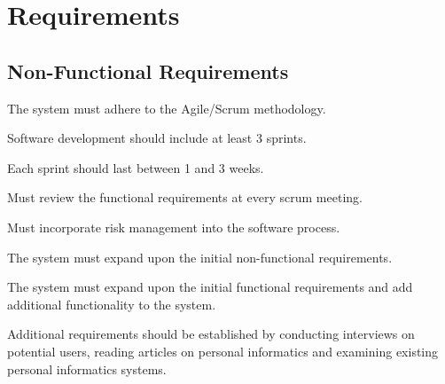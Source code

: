 \section{Requirements}\label{sec:requirements}

\subsection{Non-Functional Requirements}\label{ssec:non-functional-requirements}

\renewcommand*{\arraystretch}{1.4}
\begin{reqtable}
  
  \reqheader

  {The system must adhere to the Agile/Scrum methodology.}
  \phigh
  \dnone
  \sspec

  {Software development should include at least 3 sprints.}
  \pmed
  \deps{\ref{req:agile-scrum}, \ref{req:1-3-weeks}}
  \sspec

  {Each sprint should last between 1 and 3 weeks.}
  \pmed
  \deps{\ref{req:agile-scrum}, \ref{req:3-sprints}}
  \sspec

  {Must review the functional requirements at every scrum meeting.}
  \phigh
  \deps{\ref{req:1-3-weeks}}
  \sspec

  {Must incorporate risk management into the software process.}
  \phigh
  \deps{\ref{req:agile-scrum}}
  \sspec

  
  \reqheader

  {The system must expand upon the initial non-functional requirements.}
  \phigh
  \dnone
  \sspec

  {The system must expand upon the initial functional requirements and add additional functionality
    to the system.}
  \phigh
  \dnone
  \sspec

  {Additional requirements should be established by conducting interviews on potential users,
    reading articles on personal informatics and examining existing personal informatics systems.}
  \phigh
  \deps{\ref{req:expand-non-func}, \ref{req:expand-func}}
  \sspec


\end{reqtable}
